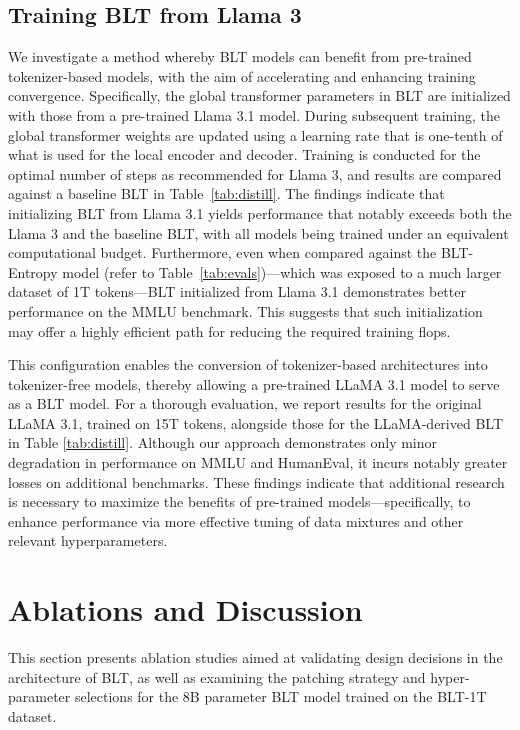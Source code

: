 \subsection{Training {\textsc BLT} from Llama 3}
\label{sec:distillation}
We investigate a method whereby {\textsc BLT} models can benefit from pre-trained tokenizer-based models, with the aim of accelerating and enhancing training convergence. Specifically, the global transformer parameters in {\textsc BLT} are initialized with those from a pre-trained Llama 3.1 model. During subsequent training, the global transformer weights are updated using a learning rate that is one-tenth of what is used for the local encoder and decoder. Training is conducted for the optimal number of steps as recommended for Llama 3, and results are compared against a baseline {\textsc BLT} in Table~\ref{tab:distill}. The findings indicate that initializing {\textsc BLT} from Llama 3.1 yields performance that notably exceeds both the Llama 3 and the baseline {\textsc BLT}, with all models being trained under an equivalent computational budget. Furthermore, even when compared against the {\textsc BLT}-Entropy model (refer to Table~\ref{tab:evals})—which was exposed to a much larger dataset of 1T tokens—{\textsc BLT} initialized from Llama 3.1 demonstrates better performance on the MMLU benchmark. This suggests that such initialization may offer a highly efficient path for reducing the required training flops.

This configuration enables the conversion of tokenizer-based architectures into tokenizer-free models, thereby allowing a pre-trained LLaMA 3.1 model to serve as a {\textsc BLT} model. For a thorough evaluation, we report results for the original LLaMA 3.1, trained on 15T tokens, alongside those for the LLaMA-derived {\textsc BLT} in Table \ref{tab:distill}. Although our approach demonstrates only minor degradation in performance on MMLU and HumanEval, it incurs notably greater losses on additional benchmarks. These findings indicate that additional research is necessary to maximize the benefits of pre-trained models—specifically, to enhance performance via more effective tuning of data mixtures and other relevant hyperparameters.

\section{Ablations and Discussion}
\label{section:ablations}
This section presents ablation studies aimed at validating design decisions in the architecture of {\textsc BLT}, as well as examining the patching strategy and hyper-parameter selections for the 8B parameter {\textsc BLT} model trained on the {\textsc BLT}-1T dataset.

